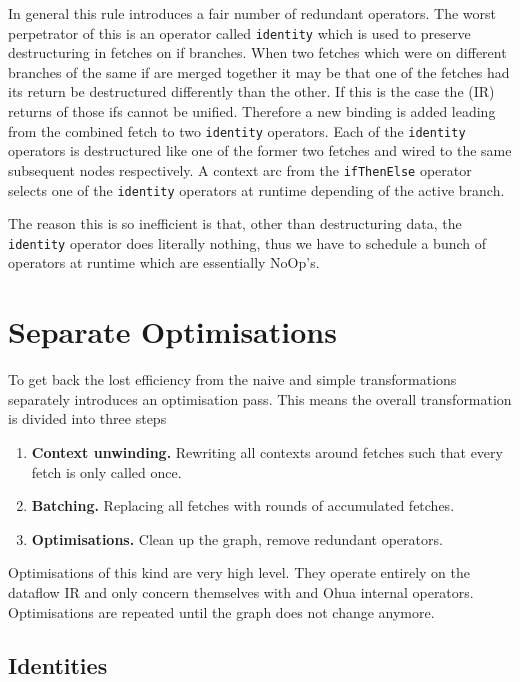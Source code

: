 In general this rule introduces a fair number of redundant operators.
The worst perpetrator of this is an operator called \texttt{identity} which is used to preserve destructuring in fetches on if branches.
When two fetches which were on different branches of the same if are merged together it may be that one of the fetches had its return be destructured differently than the other.
If this is the case the (IR) returns of those ifs cannot be unified.
Therefore a new binding is added leading from the combined fetch to two \texttt{identity} operators.
Each of the \texttt{identity} operators is destructured like one of the former two fetches and wired to the same subsequent nodes respectively.
A context arc from the \texttt{ifThenElse} operator selects one of the \texttt{identity} operators at runtime depending of the active branch.

The reason this is so inefficient is that, other than destructuring data, the \texttt{identity} operator does literally nothing, thus we have to schedule a bunch of operators at runtime which are essentially NoOp's.

\section{Separate Optimisations}

To get back the lost efficiency from the naive and simple transformations \yauhau{} separately introduces an optimisation pass.
This means the overall transformation is divided into three steps

\begin{enumerate}
    \item \textbf{Context unwinding.} Rewriting all contexts around fetches such that every fetch is only called once.
    \item \textbf{Batching.} Replacing all fetches with rounds of accumulated fetches.
    \item \textbf{Optimisations.} Clean up the graph, remove redundant operators.
\end{enumerate}

Optimisations of this kind are very high level.
They operate entirely on the dataflow IR and only concern themselves with \yauhau{} and Ohua internal operators.
Optimisations are repeated until the graph does not change anymore.


\subsection{Identities}

